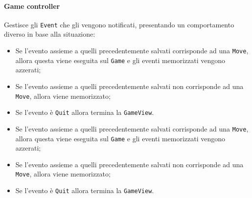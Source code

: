 \paragraph{Game controller}
%
Gestisce gli \texttt{Event} che gli vengono notificati, presentando un comportamento diverso in base alla situazione:
\begin{itemize}
    \item Se l'evento assieme a quelli precedentemente salvati corrisponde ad una \texttt{Move}, allora questa viene eseguita sul \texttt{Game} e gli eventi memorizzati vengono azzerati;
    \item Se l'evento assieme a quelli precedentemente salvati non corrisponde ad una \texttt{Move}, allora viene memorizzato;
    \item Se l'evento è \texttt{Quit} allora termina la \texttt{GameView}.
\end{itemize}
\begin{itemize}
    \item Se l'evento assieme a quelli precedentemente salvati corrisponde ad una \texttt{Move}, allora questa viene eseguita sul \texttt{Game} e gli eventi memorizzati vengono azzerati;
    \item Se l'evento assieme a quelli precedentemente salvati non corrisponde ad una \texttt{Move}, allora viene memorizzato;
    \item Se l'evento è \texttt{Quit} allora termina la \texttt{GameView}.
\end{itemize}
